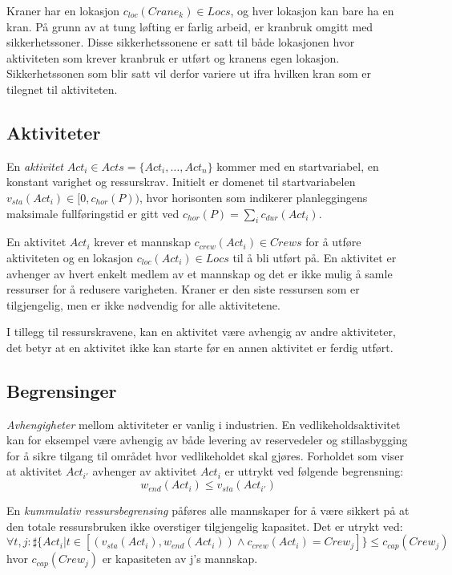 Kraner har en lokasjon $ c_{loc}(Crane_{k}) \in Locs $, og hver lokasjon kan bare ha en kran. På grunn av at tung løfting er farlig arbeid, er kranbruk omgitt med sikkerhetssoner. Disse sikkerhetssonene er satt til både lokasjonen hvor aktiviteten som krever kranbruk er utført og kranens egen lokasjon. Sikkerhetssonen som blir satt vil derfor variere ut ifra hvilken kran som er tilegnet til aktiviteten.

\subsection{Aktiviteter}
En \textit{aktivitet} $ Act_{i} \in Acts = \{ Act_{i},\dots,Act_{n} \} $ kommer med en startvariabel, en konstant varighet og ressurskrav. Initielt er domenet til startvariabelen $ v_{sta}(Act_{i}) \in [ 0, c_{hor}(P)) $, hvor horisonten som indikerer planleggingens maksimale fullføringstid er gitt ved $ c_{hor}(P) = \sum_{i} c_{dur}(Act_{i}) $.

En aktivitet $ Act_{i} $ krever et mannskap $ c_{crew}(Act_{i}) \in Crews $ for å utføre aktiviteten og en lokasjon $ c_{loc}(Act_{i}) \in Locs $ til å bli utført på. En aktivitet er avhenger av hvert enkelt medlem av et mannskap og det er ikke mulig å samle ressurser for å redusere varigheten. Kraner er den siste ressursen som er tilgjengelig, men er ikke nødvendig for alle aktivitetene.

I tillegg til ressurskravene, kan en aktivitet være avhengig av andre aktiviteter, det betyr at en aktivitet ikke kan starte før en annen aktivitet er ferdig utført.

\subsection{Begrensinger}
\textit{Avhengigheter} mellom aktiviteter er vanlig i industrien. En vedlikeholdsaktivitet kan for eksempel være avhengig av både levering av reservedeler og stillasbygging for å sikre tilgang til området hvor vedlikeholdet skal gjøres. Forholdet som viser at aktivitet $ Act_{i'} $ avhenger av aktivitet $ Act_{i} $ er uttrykt ved følgende begrensning: 
\begin{equation}
w_{end}(Act_{i}) \leq v_{sta}(Act_{i'})
\end{equation}

En \textit{kummulativ ressursbegrensing} påføres alle mannskaper for å være sikkert på at den totale ressursbruken ikke overstiger tilgjengelig kapasitet. Det er utrykt ved: 
\begin{equation}
\forall t,j : \sharp \{ Act_{i} | t \in [(v_{sta}(Act_{i}), w_{end}(Act_{i})) \wedge c_{crew}(Act_{i}) = Crew_{j}] \} \leq c_{cap}(Crew_{j})
\end{equation}
hvor $ c_{cap}(Crew_{j}) $ er kapasiteten av j's mannskap.

